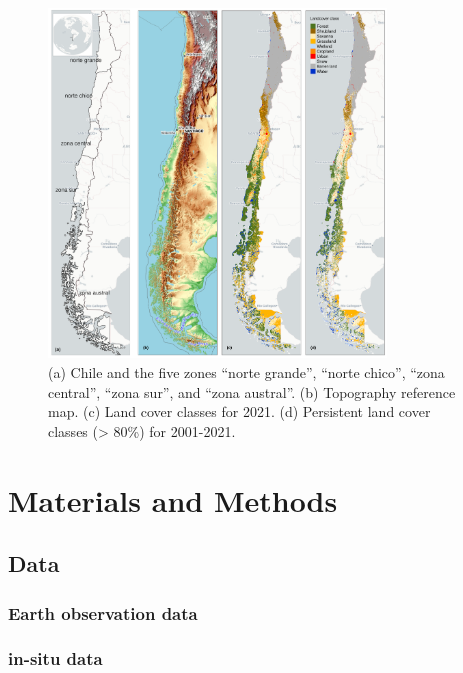 \documentclass[
  number,
  preprint,
  3p]{elsarticle}
\begin{document}
\begin{figure}[ht]

{\centering \includegraphics[width=0.8\textwidth,height=\textheight]{../output/figs/map_study_con_landcover.png}

}

\caption{(a) Chile and the five zones ``norte grande'', ``norte chico'',
``zona central'', ``zona sur'', and ``zona austral''. (b) Topography
reference map. (c) Land cover classes for 2021. (d) Persistent land
cover classes (\textgreater{} 80\%) for 2001-2021.}

\end{figure}

\hypertarget{materials-and-methods}{%
\section{Materials and Methods}\label{materials-and-methods}}

\hypertarget{data}{%
\subsection{Data}\label{data}}

\hypertarget{earth-observation-data}{%
\subsubsection{Earth observation data}\label{earth-observation-data}}

\hypertarget{in-situ-data}{%
\subsubsection{in-situ data}\label{in-situ-data}}
\end{document}
